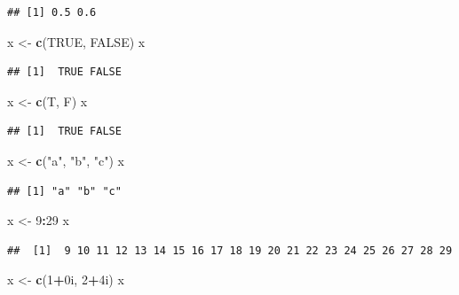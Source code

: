 \documentclass[]{book}
\newenvironment{Shaded}{\begin{snugshade}}{\end{snugshade}}
\newcommand{\DecValTok}[1]{\textcolor[rgb]{0.00,0.00,0.81}{#1}}
\newcommand{\KeywordTok}[1]{\textcolor[rgb]{0.13,0.29,0.53}{\textbf{#1}}}
\newcommand{\NormalTok}[1]{#1}
\newcommand{\OperatorTok}[1]{\textcolor[rgb]{0.81,0.36,0.00}{\textbf{#1}}}
\newcommand{\OtherTok}[1]{\textcolor[rgb]{0.56,0.35,0.01}{#1}}
\newcommand{\StringTok}[1]{\textcolor[rgb]{0.31,0.60,0.02}{#1}}
\begin{document}
\begin{verbatim}
## [1] 0.5 0.6
\end{verbatim}

\begin{Shaded}
\begin{Highlighting}[]
\NormalTok{x <-}\StringTok{ }\KeywordTok{c}\NormalTok{(}\OtherTok{TRUE}\NormalTok{, }\OtherTok{FALSE}\NormalTok{)}
\NormalTok{x}
\end{Highlighting}
\end{Shaded}

\begin{verbatim}
## [1]  TRUE FALSE
\end{verbatim}

\begin{Shaded}
\begin{Highlighting}[]
\NormalTok{x <-}\StringTok{ }\KeywordTok{c}\NormalTok{(T, F)}
\NormalTok{x}
\end{Highlighting}
\end{Shaded}

\begin{verbatim}
## [1]  TRUE FALSE
\end{verbatim}

\begin{Shaded}
\begin{Highlighting}[]
\NormalTok{x <-}\StringTok{ }\KeywordTok{c}\NormalTok{(}\StringTok{"a"}\NormalTok{, }\StringTok{"b"}\NormalTok{, }\StringTok{"c"}\NormalTok{)}
\NormalTok{x}
\end{Highlighting}
\end{Shaded}

\begin{verbatim}
## [1] "a" "b" "c"
\end{verbatim}

\begin{Shaded}
\begin{Highlighting}[]
\NormalTok{x <-}\StringTok{ }\DecValTok{9}\OperatorTok{:}\DecValTok{29}
\NormalTok{x}
\end{Highlighting}
\end{Shaded}

\begin{verbatim}
##  [1]  9 10 11 12 13 14 15 16 17 18 19 20 21 22 23 24 25 26 27 28 29
\end{verbatim}

\begin{Shaded}
\begin{Highlighting}[]
\NormalTok{x <-}\StringTok{ }\KeywordTok{c}\NormalTok{(}\DecValTok{1}\OperatorTok{+}\NormalTok{0i, }\DecValTok{2}\OperatorTok{+}\NormalTok{4i)}
\NormalTok{x}
\end{Highlighting}
\end{Shaded}
\end{document}
